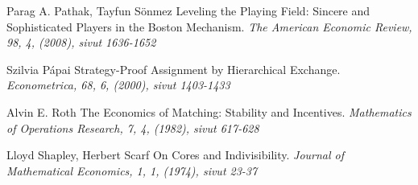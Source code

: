 \documentclass[gradu, twoside]{tktltiki}
\begin{document}
\begin{thebibliography}{XXX99}
  Parag A. Pathak, Tayfun Sönmez
  Leveling the Playing Field: Sincere and Sophisticated Players in the
  Boston Mechanism.
  \emph{The American Economic Review, 98, 4, (2008), sivut 1636-1652}

  Szilvia Pápai
  Strategy-Proof Assignment by Hierarchical Exchange.
  \emph{Econometrica, 68, 6, (2000), sivut 1403-1433}

  Alvin E. Roth
  The Economics of Matching: Stability and Incentives.
  \emph{Mathematics of Operations Research, 7, 4, (1982), sivut 617-628}

  Lloyd Shapley, Herbert Scarf
  On Cores and Indivisibility.
  \emph{Journal of Mathematical Economics, 1, 1, (1974), sivut 23-37}

\end{thebibliography}
\end{document}
